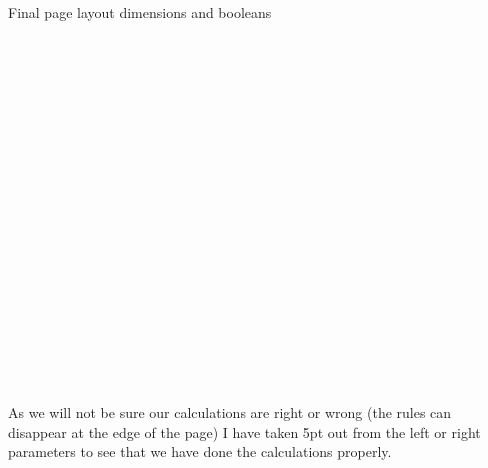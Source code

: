 \makeatletter
\newcommand\print@finalparams@cx{%
  \parindent0pt
  \par\noindent
   Final page layout dimensions and booleans
  
  \string\paperwidth\space\space\the\paperwidth\\%
  \string\paperheight\space\space\the\paperheight\\%
  \string\textwidth\space\space\the\textwidth\\%
  \string\textheight\space\space\the\textheight\\%
  \string\oddsidemargin\space\space\the\oddsidemargin\\%
  \string\evensidemargin\space\space\the\evensidemargin\\%
  \string\topmargin\space\space\the\topmargin\\%
  \string\headheight\space\space\the\headheight\\%
  \string\headsep\space\space\the\headsep\\%
  \string\footskip\space\space\the\footskip\\%
  \string\marginparwidth\space\space\the\marginparwidth\\%
  \string\marginparsep\space\space\the\marginparsep\\%
  \string\columnsep\space\space\the\columnsep\\%
  \string\columnseprule\space\space\the\columnseprule\\%
  \string\skip\string\footins\space\space\the\footins\\%
  \string\hoffset\space\space\the\hoffset\\%
  \string\voffset\space\space\the\voffset\\%
  \string\mag\space\space\the\mag\\%
  \if@twocolumn\string\@twocolumntrue\space\fi%
  
  \if@twoside\string\@twosidetrue\space\fi%
  
  \if@mparswitch\string\@mparswitchtrue\space\fi%
  
  \if@reversemargin\string\@reversemargintrue\space\fi%
  
}%

\print@finalparams@cx
\par

As we will not be sure our calculations are right or wrong (the rules can disappear at the edge of the page) I have
taken 5pt out from the left or right parameters to see that we have done the calculations properly.

